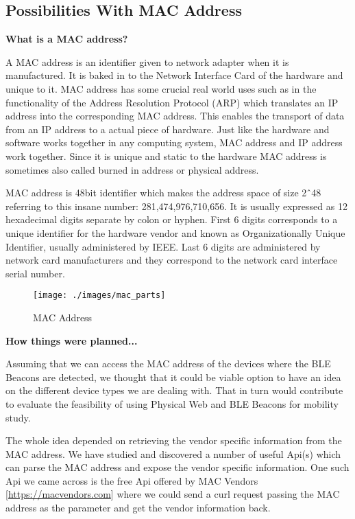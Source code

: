 \subsection{Possibilities With MAC Address}

\textbf{What is a MAC address\cite{MACAddress}?}

A MAC address is an identifier given to network adapter when it is manufactured. It is baked in to the Network Interface Card of the hardware and unique to it. MAC address has some crucial real world uses such as in the functionality of the Address Resolution Protocol (ARP) which translates an IP address into the corresponding MAC address. This enables the transport of data from an IP address to a actual piece of hardware. Just like the hardware and software works together in any computing system, MAC address and IP address work together. Since it is unique and static to the hardware MAC address is sometimes also called burned in address or physical address.

MAC address is 48bit identifier which makes the address space of size 2ˆ48 referring to this insane number: 281,474,976,710,656. It is usually expressed as 12 hexadecimal digits separate by colon or hyphen. First 6 digits corresponds to a unique identifier for the hardware vendor and known as Organizationally Unique Identifier\cite{OUI}, usually administered by IEEE. Last 6 digits are administered by network card manufacturers and they correspond to the network card  interface serial number.

\begin{figure}[H]
	\centering
	\texttt{[image: ./images/mac\_parts]}
	\caption{MAC Address}
	\label{figure1:mac_address_reference}
\end{figure}

\textbf{How things were planned...}

Assuming that we can access the MAC address of the devices where the BLE Beacons are detected, we thought that it could be viable option to have an idea on the different device types we are dealing with. That in turn would contribute to evaluate the feasibility of using Physical Web and BLE Beacons for mobility study.

The whole idea depended on retrieving the vendor specific information from the MAC address. We have studied and discovered a number of useful Api(s) which can parse the MAC address and expose the vendor specific information. One such Api we came across is the free Api offered by MAC Vendors\cite{MACVendorsApi} [\url{https://macvendors.com}] where we could send a curl request passing the MAC address as the parameter and get the vendor information back.

